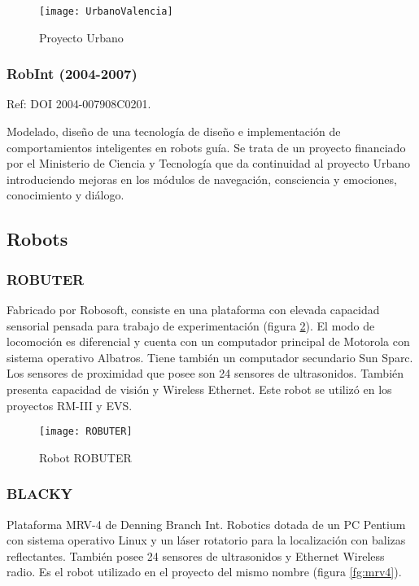 \begin{figure}[bt]
  \centering\texttt{[image: UrbanoValencia]}\\
  \caption{Proyecto Urbano}\label{fg:urbano}
\end{figure}


\subsubsection{RobInt (2004-2007)}
Ref: DOI 2004-007908C0201.

Modelado, diseño de una tecnología de diseño e implementación de comportamientos inteligentes en robots guía. Se trata de un proyecto financiado por el Ministerio de Ciencia y Tecnología que da continuidad al proyecto Urbano introduciendo mejoras en los módulos de navegación, consciencia y emociones, conocimiento y diálogo.

\subsection{Robots}
\subsubsection{ROBUTER}
Fabricado por Robosoft, consiste en una plataforma con elevada capacidad sensorial pensada para trabajo de experimentación (figura \ref{fg:robuter}). El modo de locomoción es diferencial y cuenta con un computador principal de Motorola con sistema operativo Albatros. Tiene también un computador secundario Sun Sparc. Los sensores de proximidad que posee son 24 sensores de ultrasonidos. También presenta capacidad de visión y Wireless Ethernet. Este robot se utilizó en los proyectos RM-III y EVS.

\begin{figure}[hbt]
  \centering\texttt{[image: ROBUTER]}\\
  \caption{Robot ROBUTER}\label{fg:robuter}
\end{figure}

\subsubsection{BLACKY}
Plataforma MRV-4 de Denning Branch Int. Robotics dotada de un PC Pentium con sistema operativo Linux y un láser rotatorio para la localización con balizas reflectantes. También posee 24 sensores de ultrasonidos y Ethernet Wireless radio. Es el robot utilizado en el proyecto del mismo nombre (figura \ref{fg:mrv4}).

